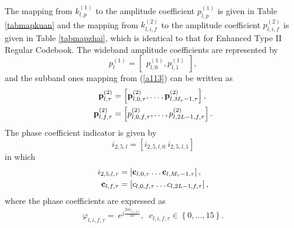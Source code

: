 \documentclass[lettersize,journal]{IEEEtran}
\begin{document}
The mapping from $k_{l,p}^{(1)}$ to the amplitude coefficient $p_{l,p}^{(1)}$ is given in Table \ref{tabmapkuan} and the mapping from $k_{l,i,f}^{(2)}$ to the amplitude coefficient $p_{l,i,f}^{(2)}$ is given in Table \ref{tabmapzhai}, which is identical to that for Enhanced Type II Regular Codebook. The wideband amplitude coefficients are represented by 
\begin{equation}
p_l^{\left( 1 \right)} = \left[ {\begin{aligned}
{p_{l,0}^{\left( 1 \right)}},{p_{l,1}^{\left( 1 \right)}}
\end{aligned}} \right],   
\end{equation}
and the subband ones mapping from (\ref{a113}) can be written as
\begin{equation}
\begin{aligned}
{\bf{p}}_{l,\tau}^{(2)} &= \left[ {{\bf{p}}_{l,0,\tau}^{(2)}, \ldots ,{\bf{p}}_{l,{M_v } - 1,\tau}^{(2)}} \right],\\
{\bf{p}}_{l,f,\tau}^{(2)} &= \left[ {p_{l,0,f,\tau}^{(2)}, \ldots ,p_{l,2L - 1,f,\tau}^{(2)}} \right].
\end{aligned}
\end{equation}
The phase coefficient indicator is given by
\begin{equation}
  i_{2,5,l}=[i_{2,5,l,0}\ i_{2,5,l,1}]  
\end{equation}
in which
\begin{equation}
\begin{aligned}
 {i_{2,5,l,\tau}} &= \left[ {{{\bf{c}}_{l,0,\tau}} \ldots {{\bf{c}}_{l,{M_v } - 1,\tau}}} \right], \\ {{\bf{c}}_{l,f,\tau}} &= \left[ {{c_{l,0,f,\tau}} \ldots {c_{l,2L - 1,f,\tau}}} \right],      
\end{aligned}
\end{equation}
where the phase coefficients are expressed as 
\begin{equation}
\begin{aligned}
\varphi_{l,i,f,\tau}=\ e^{j\frac{2\pi c_{l,i,f,\tau}}{16}},\;\;{c_{l,i,f,\tau}} \in \left\{ {0, \ldots ,15} \right\}.
\end{aligned}
\end{equation}
\end{document}
